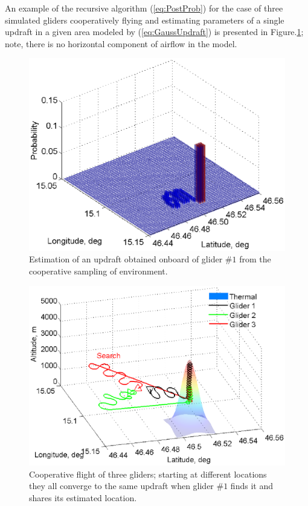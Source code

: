 \documentclass{ifacconf}
\begin{document}
An example of the recursive algorithm (\ref{eq:PostProb}) for the case of
three simulated gliders cooperatively flying and estimating parameters of a
single updraft in a given area modeled by (\ref{eq:GaussUpdraft}) is
presented in Figure.\ref{fig:SimPDF}; note, there is no horizontal component
of airflow in the model.
\begin{figure}[thpb]
  \centering
  \includegraphics[scale=0.51]{Figures/Mapping_thermals.eps}
  \caption{Estimation of an updraft obtained onboard of glider $\#1$ from
  the cooperative sampling of environment.}
  \label{fig:SimPDF}
\end{figure}
\begin{figure}[thpb]
  \centering
  \includegraphics[scale=0.41]{Figures/paths_cooperative_flight.eps}
  \caption{Cooperative flight of three gliders; starting at different locations
  they all converge to the same updraft when glider $\#1$ finds it and
  shares its estimated location.}
  \label{fig:CoopFlightPaths}
\end{figure}
\end{document}
